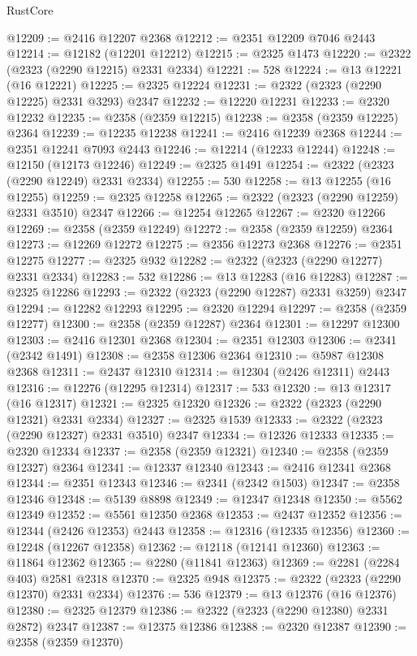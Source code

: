 \begin{lexlean}{RustCore}
\begin{coremodule}
@12209 := @2416 @12207 @2368
@12212 := @2351 @12209 @7046 @2443
@12214 := @12182 (@12201 @12212)
@12215 := @2325 @1473
@12220 := @2322 (@2323 (@2290 @12215) @2331 @2334)
@12221 := 528
@12224 := @13 @12221 (@16 @12221)
@12225 := @2325 @12224
@12231 := @2322 (@2323 (@2290 @12225) @2331 @3293) @2347
@12232 := @12220 @12231
@12233 := @2320 @12232
@12235 := @2358 (@2359 @12215)
@12238 := @2358 (@2359 @12225) @2364
@12239 := @12235 @12238
@12241 := @2416 @12239 @2368
@12244 := @2351 @12241 @7093 @2443
@12246 := @12214 (@12233 @12244)
@12248 := @12150 (@12173 @12246)
@12249 := @2325 @1491
@12254 := @2322 (@2323 (@2290 @12249) @2331 @2334)
@12255 := 530
@12258 := @13 @12255 (@16 @12255)
@12259 := @2325 @12258
@12265 := @2322 (@2323 (@2290 @12259) @2331 @3510) @2347
@12266 := @12254 @12265
@12267 := @2320 @12266
@12269 := @2358 (@2359 @12249)
@12272 := @2358 (@2359 @12259) @2364
@12273 := @12269 @12272
@12275 := @2356 @12273 @2368
@12276 := @2351 @12275
@12277 := @2325 @932
@12282 := @2322 (@2323 (@2290 @12277) @2331 @2334)
@12283 := 532
@12286 := @13 @12283 (@16 @12283)
@12287 := @2325 @12286
@12293 := @2322 (@2323 (@2290 @12287) @2331 @3259) @2347
@12294 := @12282 @12293
@12295 := @2320 @12294
@12297 := @2358 (@2359 @12277)
@12300 := @2358 (@2359 @12287) @2364
@12301 := @12297 @12300
@12303 := @2416 @12301 @2368
@12304 := @2351 @12303
@12306 := @2341 (@2342 @1491)
@12308 := @2358 @12306 @2364
@12310 := @5987 @12308 @2368
@12311 := @2437 @12310
@12314 := @12304 (@2426 @12311) @2443
@12316 := @12276 (@12295 @12314)
@12317 := 533
@12320 := @13 @12317 (@16 @12317)
@12321 := @2325 @12320
@12326 := @2322 (@2323 (@2290 @12321) @2331 @2334)
@12327 := @2325 @1539
@12333 := @2322 (@2323 (@2290 @12327) @2331 @3510) @2347
@12334 := @12326 @12333
@12335 := @2320 @12334
@12337 := @2358 (@2359 @12321)
@12340 := @2358 (@2359 @12327) @2364
@12341 := @12337 @12340
@12343 := @2416 @12341 @2368
@12344 := @2351 @12343
@12346 := @2341 (@2342 @1503)
@12347 := @2358 @12346
@12348 := @5139 @8898
@12349 := @12347 @12348
@12350 := @5562 @12349
@12352 := @5561 @12350 @2368
@12353 := @2437 @12352
@12356 := @12344 (@2426 @12353) @2443
@12358 := @12316 (@12335 @12356)
@12360 := @12248 (@12267 @12358)
@12362 := @12118 (@12141 @12360)
@12363 := @11864 @12362
@12365 := @2280 (@11841 @12363)
@12369 := @2281 (@2284 @403) @2581 @2318
@12370 := @2325 @948
@12375 := @2322 (@2323 (@2290 @12370) @2331 @2334)
@12376 := 536
@12379 := @13 @12376 (@16 @12376)
@12380 := @2325 @12379
@12386 := @2322 (@2323 (@2290 @12380) @2331 @2872) @2347
@12387 := @12375 @12386
@12388 := @2320 @12387
@12390 := @2358 (@2359 @12370)

\end{coremodule}
\end{lexlean}
